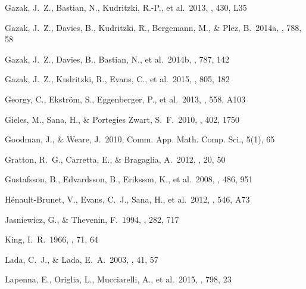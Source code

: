 \documentclass[useAMS,usenatbib]{mn2e}
\begin{document}
\begin{thebibliography}{99}
 Gazak, J.~Z., Bastian,
N., Kudritzki, R.-P., et al.\ 2013, \mnras, 430, L35

 Gazak, J.~Z., Davies, B.,
Kudritzki, R., Bergemann, M., \& Plez, B.\ 2014a, \apj, 788, 58

 Gazak, J.~Z., Davies, B.,
Bastian, N., et al.\ 2014b, \apj, 787, 142

 Gazak, J.~Z., Kudritzki,
R., Evans, C., et al.\ 2015, \apj, 805, 182

 Georgy, C., Ekstr{\"o}m, S., Eggenberger, P., et al.\ 2013, \aap, 558, A103

 Gieles, M., Sana, H.,
\& Portegies Zwart, S.~F.\ 2010, \mnras, 402, 1750



 Goodman, J., \&
Weare, J.\ 2010, Comm. App. Math. Comp. Sci., 5(1), 65

 Gratton, R.~G., Carretta, E., \& Bragaglia, A.\ 2012, \aapr, 20, 50


 Gustafsson, B., Edvardsson, B., Eriksson, K., et al.\ 2008, \aap, 486, 951

 H{\'e}nault-Brunet, V., Evans, C.~J., Sana, H., et al.\ 2012, \aap, 546, A73

 Jasniewicz, G., \& Thevenin, F.\ 1994, \aap, 282, 717

 King, I.~R.\ 1966, \aj, 71, 64

 Lada, C.~J., \& Lada, E.~A.\ 2003, \araa, 41, 57

 Lapenna, E., Origlia,
L., Mucciarelli, A., et al.\ 2015, \apj, 798, 23


\end{thebibliography}
\end{document}
